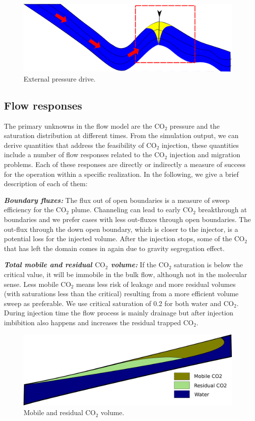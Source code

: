 \begin{figure}[thb]
  \centering
  \includegraphics[width=0.65 \linewidth]{./figurer/bkw} 
  \caption{External pressure drive.}
  \label{fig:bkw}
%
\end{figure}


\subsection{Flow responses}

The primary unknowns in the flow model are the $\mbox{CO}_2$ pressure
and the saturation distribution at different times. From the simulation
output, we can derive quantities that
address the feasibility of $\mbox{CO}_2$ injection,
these quantities include a number of flow responses related to the $\mbox{CO}_2$
injection and migration problems. Each of these responses are directly or
indirectly a measure of success for the operation within a specific realization.
In the following, we give a brief description of each of them:

\textbf{\textit{Boundary fluxes:}} The flux out of open boundaries is a measure
of sweep efficiency for the
CO$_2$ plume. Channeling can lead to early CO$_2$ breakthrough at boundaries and
we prefer cases with less out-fluxes through open boundaries. The out-flux
through the down open boundary, which is closer to the injector, is a potential
loss for the injected volume. After the injection stops, some of the CO$_2$ that
has left the domain comes in again due to gravity segregation effect. 

\textbf{\textit{Total mobile and residual $\mbox{CO}_2$ volume:}}
If the CO$_2$ saturation is below the critical value, it will be immobile in the
bulk flow, although not in the molecular sense. Less mobile CO$_2$ means less
risk of leakage and more residual volumes (with saturations less than the
critical) resulting from a more efficient volume sweep as preferable. We use
critical saturation of 0.2 for both water and CO$_2$. During injection time the
flow process is mainly drainage but after injection imbibition also happens and
increases the residual trapped CO$_2$. 

\begin{figure}[thb]
  \centering
  \includegraphics[width=0.65 \linewidth]{./figurer/MobRes} 
  \caption{Mobile and residual CO$_2$ volume.}
  \label{fig:MobRes}
%
\end{figure}


